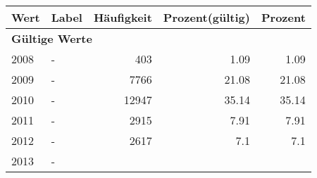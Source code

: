      \begin{longtable}{lXrrr}
     \toprule
     \textbf{Wert} & \textbf{Label} & \textbf{Häufigkeit} & \textbf{Prozent(gültig)} & \textbf{Prozent} \\
     \endhead
     \midrule
     \multicolumn{5}{l}{\textbf{Gültige Werte}}\\

     2008 &
     \multicolumn{1}{X}{ -  } &


       \num{403} &
       \num[round-mode=places,round-precision=2]{1,09} &
         \num[round-mode=places,round-precision=2]{1,09} \\

     2009 &
     \multicolumn{1}{X}{ -  } &


       \num{7766} &
       \num[round-mode=places,round-precision=2]{21,08} &
         \num[round-mode=places,round-precision=2]{21,08} \\

     2010 &
     \multicolumn{1}{X}{ -  } &


       \num{12947} &
       \num[round-mode=places,round-precision=2]{35,14} &
         \num[round-mode=places,round-precision=2]{35,14} \\

     2011 &
     \multicolumn{1}{X}{ -  } &


       \num{2915} &
       \num[round-mode=places,round-precision=2]{7,91} &
         \num[round-mode=places,round-precision=2]{7,91} \\

     2012 &
     \multicolumn{1}{X}{ -  } &


       \num{2617} &
       \num[round-mode=places,round-precision=2]{7,1} &
         \num[round-mode=places,round-precision=2]{7,1} \\

     2013 &
     \multicolumn{1}{X}{ -  } &



\end{longtable}
